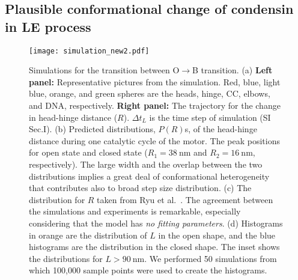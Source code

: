 \documentclass[fleqn,10pt]{wlscirep}
\newcommand{\nm}{\ \mathrm{nm}}
\newcommand{\vR}{R}
\newcommand{\vL}{L}
\begin{document}
\subsection*{Plausible conformational change of condensin in LE process}
\begin{figure}[]
\centering
\texttt{[image: simulation\_new2.pdf]}
\caption{\label{fig:delR} Simulations for the transition between O$\rightarrow$B transition. (a) {\bf Left panel:} Representative pictures from the simulation. Red, blue, light blue, orange, and green spheres are the heads, hinge, CC, elbows, and DNA, respectively. {\bf Right panel:} The trajectory for the change in head-hinge distance ($\vR$). $\Delta t_L$ is the time step of simulation (SI Sec.I). (b) Predicted distributions, $P(\vR)$s, of the head-hinge distance during one catalytic cycle of the motor. The peak positions for open state and closed state ($R_1=38\nm$ and $R_2=16\nm$, respectively). The large width and the overlap between the two distributions implies a great deal of conformational heterogeneity that contributes also to broad step size distribution. (c) The distribution for $\vR$ taken from Ryu et al.~\cite{ryu2020condensin}.  The agreement between the simulations and experiments is remarkable, especially considering that the model has {\it no fitting parameters}.
(d) Histograms in orange are the distribution of $\vL$ in the open shape, and the blue histograms are the distribution in the closed shape. The inset shows the distributions for $L>90\nm$. We performed 50 simulations from which 100,000 sample points were used to create the histograms. 
}
\end{figure}

\end{document}
